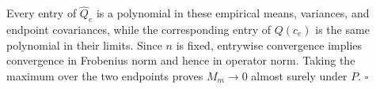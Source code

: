 Every entry of \(\widehat Q_e\) is a polynomial in these empirical means, variances, and endpoint covariances, while the corresponding entry of \(Q(c_e)\) is the same polynomial in their limits.  Since \(n\) is fixed, entrywise convergence implies convergence in Frobenius norm and hence in operator norm.  Taking the maximum over the two endpoints proves \(M_m\to0\) almost surely under \(P\). \(\square\)